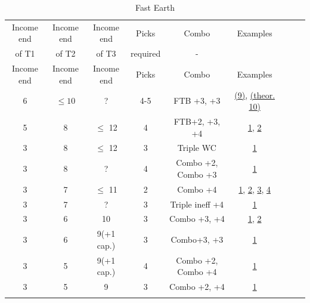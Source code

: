 \small
\begin{longtable}{|c|c|c|c|c|c|c|c|c|}
\hline
\rowcolor{Baby_Blue}
Income end & Income end & Income end & Picks & Combo & Examples \\ 
\rowcolor{Baby_Blue}
of T1 & of T2 & of T3 & required & - & \\ \hline\hline
\endfirsthead
\hline
\rowcolor{Baby_Blue}
Income end & Income end & Income end & Picks & Combo & Examples \\  \hline\hline
\endhead

6 & $\leq10$ & ? & 4-5 & FTB +3, +3 & \href{https://www.warzone.com/MultiPlayer?GameID=36702852}{(9)}, \href{https://www.warzone.com/MultiPlayer?GameID=33890320}{(theor. 10)} \\ \hline 

5 & 8 & $\leq$ 12 & 4 & FTB+2, +3, +4 & \href{https://www.warzone.com/MultiPlayer?GameID=39386070}{1}, \href{https://www.warzone.com/MultiPlayer?GameID=39154377}{2} \\ \hline

3 & 8 & $\leq$ 12 & 3 & Triple WC & \href{https://www.warzone.com/MultiPlayer?GameID=33941181}{1} \\ 
3 & 8 & ? & 4 & Combo +2, Combo +3 & \href{https://www.warzone.com/MultiPlayer?GameID=41204663}{1} \\
3 & 7 & $\leq$ 11 & 2 & Combo +4 & \href{https://www.warzone.com/MultiPlayer?GameID=41623360}{1}, \href{https://www.warzone.com/MultiPlayer?GameID=41718452}{2}, \href{https://www.warzone.com/MultiPlayer?GameID=41675020}{3}, \href{https://www.warzone.com/MultiPlayer?GameID=40414896}{4} \\
3 & 7 & ? & 3 & Triple ineff +4 & \href{https://www.warzone.com/MultiPlayer?GameID=40414907}{1} \\

\hline
3 & 6 & 10 & 3 & Combo +3, +4 & \href{https://www.warzone.com/MultiPlayer?GameID=36702852}{1}, \href{https://www.warzone.com/MultiPlayer?GameID=33649660}{2} \\
3 & 6 & 9(+1 cap.) & 3 & Combo+3, +3 & \href{https://www.warzone.com/MultiPlayer?GameID=39905768}{1} \\
3 & 5 & 9(+1 cap.) & 4 & Combo +2, Combo +4 & \href{https://www.warzone.com/MultiPlayer?GameID=39905768}{1} \\
3 & 5 & 9 & 3 & Combo +2, +4 & \href{https://www.warzone.com/MultiPlayer?GameID=41623360}{1} \\


\hline
\caption{Fast Earth}
\label{fast_earth}
\end{longtable}
\normalsize

